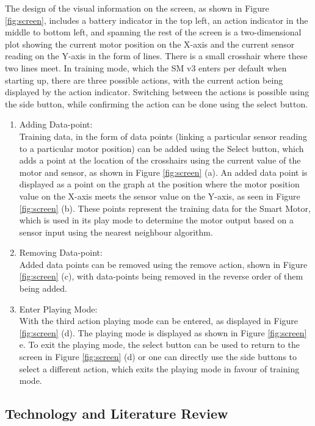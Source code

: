 The design of the visual information on the screen, as shown in Figure \ref{fig:screen}, includes a battery indicator in the top left, an action indicator in the middle to bottom left, and spanning the rest of the screen is a two-dimensional plot showing the current motor position on the X-axis and the current sensor reading on the Y-axis in the form of lines. There is a small crosshair where these two lines meet. In training mode, which the SM v3 enters per default when starting up, there are three possible actions, with the current action being displayed by the action indicator. Switching between the actions is possible using the side button, while confirming the action can be done using the select button. 
\begin{enumerate}
    \item Adding Data-point:\\
    Training data, in the form of data points (linking a particular sensor reading to a particular motor position) can be added using the Select button, which adds a point at the location of the crosshairs using the current value of the motor and sensor, as shown in Figure \ref{fig:screen} (a). An added data point is displayed as a point on the graph at the position where the motor position value on the X-axis meets the sensor value on the Y-axis, as seen in Figure \ref{fig:screen} (b). These points represent the training data for the Smart Motor, which is used in its play mode to determine the motor output based on a sensor input using the nearest neighbour algorithm.
    \item Removing Data-point:\\
    Added data points can be removed using the remove action, shown in Figure \ref{fig:screen} (c), with data-points being removed in the reverse order of them being added.
    \item Enter Playing Mode:\\
    With the third action playing mode can be entered, as displayed in Figure \ref{fig:screen} (d). The playing mode is displayed as shown in Figure \ref{fig:screen} e. To exit the playing mode, the select button can be used to return to the screen in Figure \ref{fig:screen} (d) or one can directly use the side buttons to select a different action, which exits the playing mode in favour of training mode.
\end{enumerate}

\subsection{\label{sec:methods_tech_review}Technology and Literature Review}

